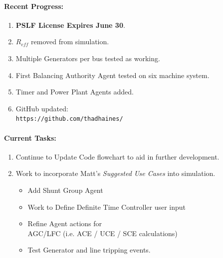 \documentclass[12pt]{article}
\begin{document}
\begin{multicols}{2}
\raggedright
	\paragraph{Recent Progress:}
	\begin{enumerate}

		\item \textbf{PSLF License Expires June 30}.

		\item $R_{eff}$ removed from simulation.

		\item Multiple Generators per bus tested as working.

		\item First Balancing Authority Agent tested on six machine system.

		\item Timer and Power Plant Agents added.


		\item GitHub updated:\\
		\verb|https://github.com/thadhaines/|
		
	\end{enumerate}
\paragraph{Current Tasks:}
	\begin{enumerate}

		\item Continue to Update Code flowchart to aid in further development.

		\item Work to incorporate Matt's \emph{Suggested Use Cases} into simulation.
		\begin{itemize}
		
		\item Add Shunt Group Agent
		\item Work to Define Definite Time Controller user input
		
		\item Refine Agent actions for \\ AGC/LFC (i.e. ACE / UCE / SCE calculations)
		\item Test Generator and line tripping events.

		\end{itemize}
		

\end{enumerate}
\end{multicols}
\end{document}

